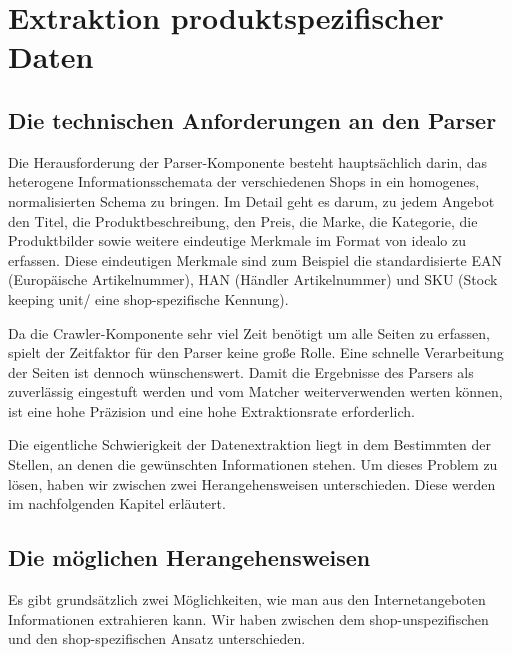 \section{Extraktion produktspezifischer Daten}
\label{sec:extraktion-produktspezifischer-daten}


\subsection{Die technischen Anforderungen an den Parser}
\label{subsec:technische-anforderungen-parser}

Die Herausforderung der Parser-Komponente besteht hauptsächlich darin, das heterogene Informationsschemata der
verschiedenen Shops in ein homogenes, normalisierten Schema zu bringen.
Im Detail geht es darum, zu jedem Angebot den Titel, die Produktbeschreibung, den Preis, die Marke, die Kategorie,
die Produktbilder sowie weitere eindeutige Merkmale im Format von idealo zu erfassen.
Diese eindeutigen Merkmale sind zum Beispiel die standardisierte EAN (Europäische Artikelnummer), HAN (Händler
Artikelnummer) und SKU (Stock keeping unit/ eine shop-spezifische Kennung).

Da die Crawler-Komponente sehr viel Zeit benötigt um alle Seiten zu erfassen, spielt der Zeitfaktor für den Parser
keine große Rolle.
Eine schnelle Verarbeitung der Seiten ist dennoch wünschenswert.
Damit die Ergebnisse des Parsers als zuverlässig eingestuft werden und vom Matcher weiterverwenden werten können, ist
eine hohe Präzision und eine hohe Extraktionsrate erforderlich.

Die eigentliche Schwierigkeit der Datenextraktion liegt in dem Bestimmten der Stellen, an denen die gewünschten
Informationen stehen.
Um dieses Problem zu lösen, haben wir zwischen zwei Herangehensweisen unterschieden.
Diese werden im nachfolgenden Kapitel erläutert.

\subsection{Die möglichen Herangehensweisen}
\label{subsec:herangehensweisen}

Es gibt grundsätzlich zwei Möglichkeiten, wie man aus den Internetangeboten Informationen extrahieren kann.
Wir haben zwischen dem shop-unspezifischen und den shop-spezifischen Ansatz unterschieden.

